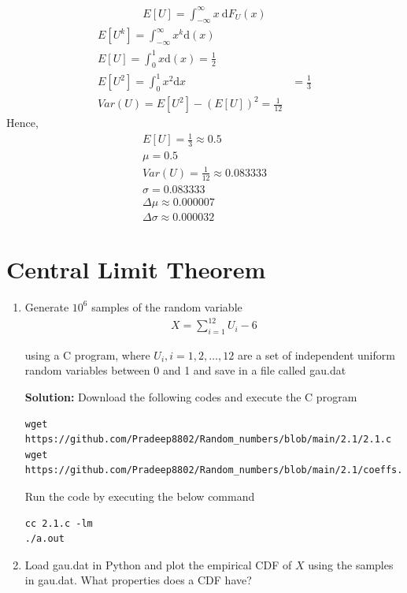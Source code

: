 \documentclass[journal,12pt,twocolumn]{IEEEtran}
\newcommand{\solution}{\noindent \textbf{Solution: }}
\providecommand{\mean}[1]{E\left[ #1 \right]}
\numberwithin{equation}{section}
\renewcommand\thesection{\arabic{section}}
\begin{document}
\begin{enumerate}[label=\thesection.\arabic*,ref=\thesection.\theenumi]
\begin{align}
\mean{U} = \int_{-\infty}^{\infty}x ~\mathrm{d}F_{U}(x) 
\end{align}
 \begin{align}    
E[U^k]=\int_{-\infty}^{\infty} x^k \mathrm{d}(x)\\
E[U]=\int_{0}^{1} x \mathrm{d}(x)=\frac{1}{2}\\
E[U^2]=\int_{0}^{1} x^2 \mathrm{d}x
&=\frac{1}{3}\\
Var(U)=E[U^2]-(E[U])^2=\frac{1}{12}
 \end{align}
Hence,
\begin{align}
		E[U]=\frac{1}{3} \approx 0.5\\
            \mu = 0.5\\
            Var(U) = \frac{1}{12} \approx 0.083333\\
            \sigma=0.083333\\
            \Delta \mu \approx 0.000007\\
            \Delta \sigma \approx 0.000032 
	\end{align}

	\section{Central Limit Theorem}

	\begin{enumerate}[label=\thesection.\arabic*,ref=\thesection.\theenumi]
	\item Generate $10^6$ samples of the random variable
	\begin{align}
		X = \sum_{i=1}^{12}U_i -6
	\end{align}

	using a C program, where $U_i, i = 1,2,\dots, 12$ are  a set of independent uniform random variables between 0 and 1 and save in a file called gau.dat
	
	\solution Download the following codes and execute the C program
	\begin{lstlisting}
wget https://github.com/Pradeep8802/Random_numbers/blob/main/2.1/2.1.c
wget https://github.com/Pradeep8802/Random_numbers/blob/main/2.1/coeffs.h
	\end{lstlisting}
	 Run the code by executing the below command
	\begin{lstlisting}
cc 2.1.c -lm
./a.out
	\end{lstlisting}
		
	\item Load gau.dat in Python and plot the empirical CDF of $X$ using the samples in gau.dat. What properties does a CDF have?


\end{enumerate}
\end{enumerate}
\end{document}
